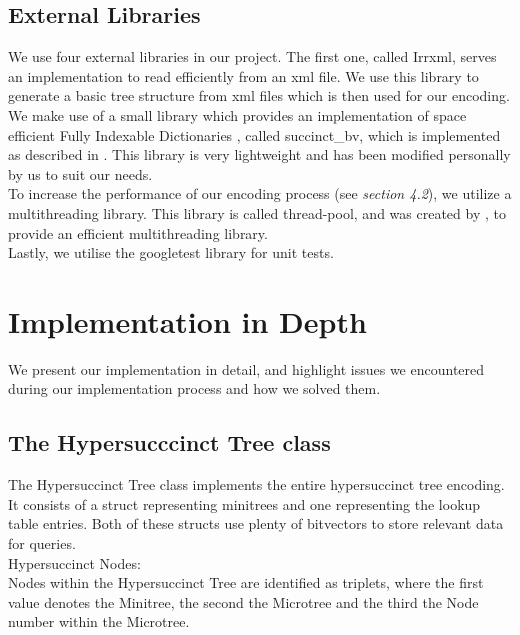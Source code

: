 \documentclass{article}
\begin{document}
\subsection{External Libraries}
We use four external libraries in our project.
The first one, called Irrxml, serves an implementation to read efficiently from an xml file. We use this library to generate a basic tree structure from xml files which is then used for our encoding.\\
We make use of a small library which provides an implementation of space efficient Fully Indexable Dictionaries \cite{universalSuccinct}, called succinct\_bv, which is implemented as described in \cite{succinctBV}.
This library is very lightweight and has been modified personally by us to suit our needs.\\
To increase the performance of our encoding process (see \textit{section 4.2}), we utilize a multithreading library. This library is called thread-pool, and was created by \cite{threading}, to provide an efficient multithreading library.\\
Lastly, we utilise the googletest library for unit tests.

\section{Implementation in Depth}
We present our implementation in detail, and highlight issues we encountered during our implementation process and how we solved them.
\subsection{The Hypersucccinct Tree class}
The Hypersuccinct Tree class implements the entire hypersuccinct tree encoding. It consists of a struct representing minitrees and one representing the lookup table entries.
Both of these structs use plenty of bitvectors to store relevant data for queries.\\

Hypersuccinct Nodes:\\
Nodes within the Hypersuccinct Tree are identified as triplets, where the first value denotes the Minitree, the second the Microtree and the third the Node number within the Microtree.\\
\end{document}
